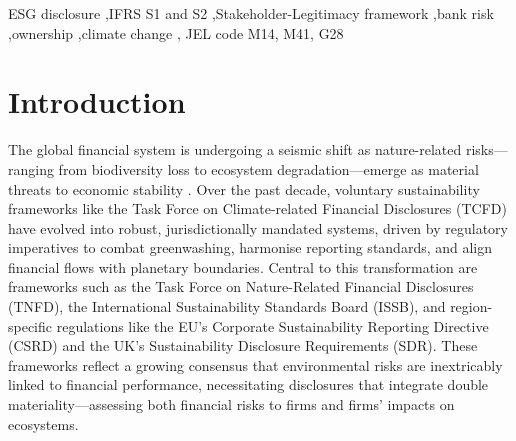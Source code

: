 \documentclass[
  authoryear]{elsarticle}
\begin{document}
\begin{frontmatter}
\begin{keyword}
    ESG disclosure \sep IFRS S1 and S2 \sep Stakeholder-Legitimacy
framework \sep bank risk \sep ownership \sep climate change \sep 
    JEL code M14, M41, G28
\end{keyword}
\end{frontmatter}
    

\newpage

\section{Introduction}\label{introduction}

The global financial system is undergoing a seismic shift as
nature-related risks---ranging from biodiversity loss to ecosystem
degradation---emerge as material threats to economic stability
\citep{UNEP2023}. Over the past decade, voluntary sustainability
frameworks like the Task Force on Climate-related Financial Disclosures
(TCFD) have evolved into robust, jurisdictionally mandated systems,
driven by regulatory imperatives to combat greenwashing, harmonise
reporting standards, and align financial flows with planetary
boundaries. Central to this transformation are frameworks such as the
Task Force on Nature-Related Financial Disclosures (TNFD), the
International Sustainability Standards Board (ISSB), and region-specific
regulations like the EU's Corporate Sustainability Reporting Directive
(CSRD) and the UK's Sustainability Disclosure Requirements (SDR). These
frameworks reflect a growing consensus that environmental risks are
inextricably linked to financial performance, necessitating disclosures
that integrate double materiality---assessing both financial risks to
firms and firms' impacts on ecosystems.
\end{document}
